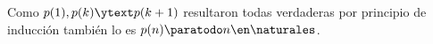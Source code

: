 \begin{enumerate}[label=\roman*)]
        \medskip

        Como $p(1), p(k) \ytext p(k+1)$ resultaron todas verdaderas por principio de inducción también lo es $p(n) \paratodo n \en \naturales$.

\end{enumerate}

\begin{aportes}
  \item {}
\end{aportes}
